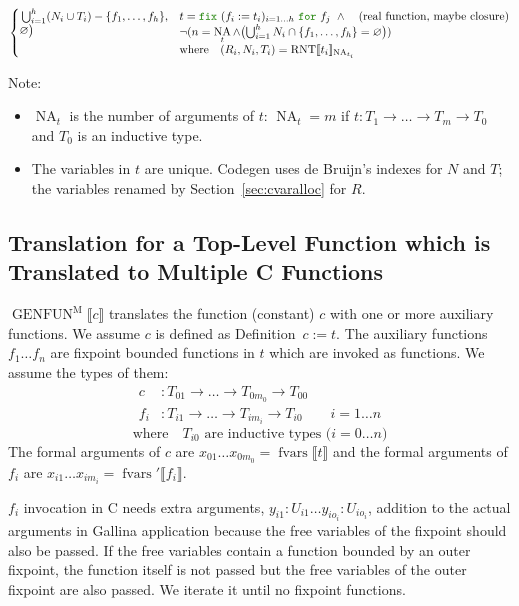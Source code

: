 \documentclass[a4paper,fleqn]{article}
\def\gallina{\textrm{Gallina}}
\def\codegen{\textrm{Codegen}}
\newcommand{\kwDefinition}{\mbox{\color{myviolet}\ttfamily Definition}}
\newcommand{\kwfix}{\mbox{\color{mygreen}\ttfamily fix}}
\newcommand{\kwfor}{\mbox{\color{mygreen}\ttfamily for}}
\newcommand{\fix}[4]{\kwfix~(#1 := #2)_{#3}~\kwfor~#4}
\DeclareMathOperator{\NA}{NA}
\newcommand{\BRA}[1]{\llbracket #1 \rrbracket}
\DeclareMathOperator{\genfunop}{GENFUN}
\newcommand{\genfunm}[1]{\genfunop^\mathrm{M}\BRA{#1}}
\DeclareMathOperator{\RNTop}{RNT}
\newcommand{\RNT}[2]{\RNTop\BRA{#1}_{#2}}
\newcommand{\secref}[1]{Section~\ref{#1}}
\DeclareMathOperator{\fvarsop}{fvars}
\newcommand{\fvars}[1]{\fvarsop\BRA{#1}}
\newcommand{\fvarsd}[1]{\fvarsop'\BRA{#1}}
\begin{document}
\begin{align*}
\begin{cases}
\begin{aligned}[t]
             & \textstyle\bigcup_{i=1}^h (N_i \cup T_i) - \{f_1,\dots, f_h\}, \\
             & \varnothing \bigr)
    \end{aligned} &
      \begin{aligned}[t]
        & t = \fix{f_i}{t_i}{i=1\dots h}{f_j} ~\wedge \quad \text{(real function, maybe closure)} \\
        & \neg (n = \NA_t \wedge \bigl(\textstyle\bigcup_{i=1}^h N_i \cap \{f_1,\dots, f_h\} = \varnothing\bigr)) \\
        & \text{where}\quad (R_i, N_i, T_i) = \RNT{t_i}{\NA_{t_i}}
      \end{aligned}
  \end{cases}
\end{align*}
{\small Note:
\begin{itemize}
  \item $\NA_t$ is the number of arguments of $t$: \quad $\NA_t=m$ if $t : T_1 \rightarrow \dots \rightarrow T_m \rightarrow T_0$ and $T_0$ is an inductive type.
  \item The variables in $t$ are unique.
    \codegen{} uses de Bruijn's indexes for $N$ and $T$;
    the variables renamed by \secref{sec:cvaralloc} for $R$.
\end{itemize}}

\subsection{Translation for a Top-Level Function which is Translated to Multiple C Functions}\label{sec:genfunm}
\raggedright
$\genfunm{c}$ translates the function (constant) $c$ with one or more auxiliary functions.
We assume $c$ is defined as \kwDefinition~$c := t.$
The auxiliary functions $f_1 \dots f_n$ are fixpoint bounded functions in $t$ which are invoked as functions.
We assume the types of them:
\begin{align*}
  c &: T_{01} \rightarrow \dots \rightarrow T_{0m_0} \rightarrow T_{00} \\
  f_i &: T_{i1} \rightarrow \dots \rightarrow T_{im_i} \rightarrow T_{i0} && i = 1\dots n
\end{align*}
\[ \text{where} \quad \text{$T_{i0}$ are inductive types ($i=0\dots n$)} \]
The formal arguments of $c$ are $x_{01}\dots x_{0m_0} = \fvars{t}$ and
the formal arguments of $f_i$ are $x_{i1}\dots x_{im_i} = \fvarsd{f_i}$.

$f_i$ invocation in C needs extra arguments, $y_{i1}:U_{i1} \dots y_{io_i}:U_{io_i}$, addition to the actual arguments in \gallina{} application because the free variables of the fixpoint should also be passed.
If the free variables contain a function bounded by an outer fixpoint, the function itself is not passed but the free variables of the outer fixpoint are also passed.
We iterate it until no fixpoint functions.
\end{document}
